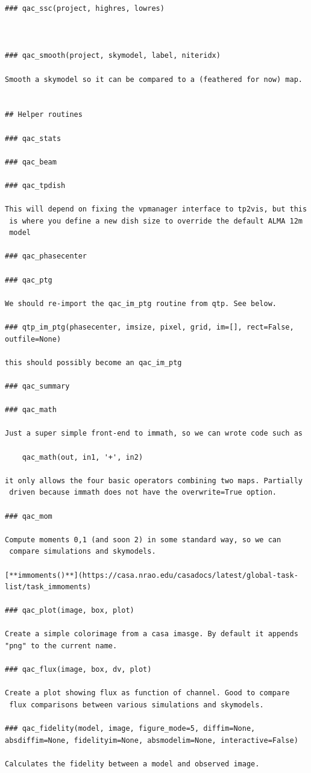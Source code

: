 \documentclass[11pt,twoside]{article}
\begin{document}
\begin{verbatim}
### qac_ssc(project, highres, lowres)



### qac_smooth(project, skymodel, label, niteridx)

Smooth a skymodel so it can be compared to a (feathered for now) map.


## Helper routines

### qac_stats

### qac_beam

### qac_tpdish

This will depend on fixing the vpmanager interface to tp2vis, but this
 is where you define a new dish size to override the default ALMA 12m
 model

### qac_phasecenter

### qac_ptg

We should re-import the qac_im_ptg routine from qtp. See below.

### qtp_im_ptg(phasecenter, imsize, pixel, grid, im=[], rect=False, outfile=None)

this should possibly become an qac_im_ptg 

### qac_summary

### qac_math

Just a super simple front-end to immath, so we can wrote code such as

    qac_math(out, in1, '+', in2)

it only allows the four basic operators combining two maps. Partially
 driven because immath does not have the overwrite=True option.

### qac_mom

Compute moments 0,1 (and soon 2) in some standard way, so we can
 compare simulations and skymodels.

[**immoments()**](https://casa.nrao.edu/casadocs/latest/global-task-list/task_immoments)

### qac_plot(image, box, plot)

Create a simple colorimage from a casa imasge. By default it appends "png" to the current name.

### qac_flux(image, box, dv, plot)

Create a plot showing flux as function of channel. Good to compare
 flux comparisons between various simulations and skymodels.

### qac_fidelity(model, image, figure_mode=5, diffim=None, absdiffim=None, fidelityim=None, absmodelim=None, interactive=False)

Calculates the fidelity between a model and observed image.



\end{verbatim}
\normalsize
\end{document}
